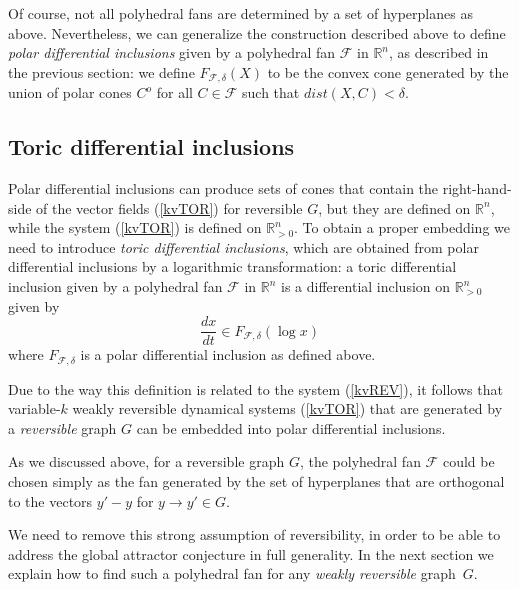 \documentclass[12pt,letterpaper]{article}
\newcommand{\F}{\mathcal{F}}
\newcommand{\RR}{\mathbb{R}}
\begin{document}
Of course, not all polyhedral fans are determined by a set of hyperplanes as above. Nevertheless, we can generalize the construction described above to define {\em polar differential inclusions} given by a polyhedral fan $\F$ in $\RR^n$, as described in the previous section: we define $F_{\F, \delta}(X)$ to be the convex cone generated by the union of polar cones $C^o$ for all $C\in\F$ such that $dist(X,C) < \delta$.







\subsection{Toric differential inclusions}

Polar differential inclusions can produce sets of cones that contain the right-hand-side of the vector fields (\ref{kvTOR}) for reversible $G$, but they are defined on $\RR^n$, while the system (\ref{kvTOR}) is defined on $\RR^n_{>0}$. To obtain a proper embedding we need to introduce {\em toric differential inclusions}, which are obtained from polar differential inclusions by a logarithmic transformation: a toric differential inclusion given by a polyhedral fan $\F$ in $\RR^n$ is a differential inclusion on $\RR^n_{>0}$ given by 
%
\begin{equation}\label{T.D.I}
\frac{dx}{dt} \in F_{\F, \delta}(\log x) 
\end{equation}
%
where $F_{\F, \delta}$ is a polar differential inclusion as defined above.

Due to the way this definition is related to the system (\ref{kvREV}), it follows that variable-$k$  weakly reversible dynamical systems (\ref{kvTOR}) that are generated by a {\em reversible} graph $G$ can be embedded into polar differential inclusions.


As we discussed above, for a reversible graph $G$, the polyhedral fan $\F$ could be chosen simply as the fan generated by the set of hyperplanes that are orthogonal to the vectors $y'-y$ for $y\to y' \in G$. 



We need to remove this strong assumption of reversibility, 
in order to be able to address the global attractor conjecture in full generality. 
%
In the next section we explain how to find such a polyhedral fan for any {\em weakly reversible} graph~$G$.
\end{document}
